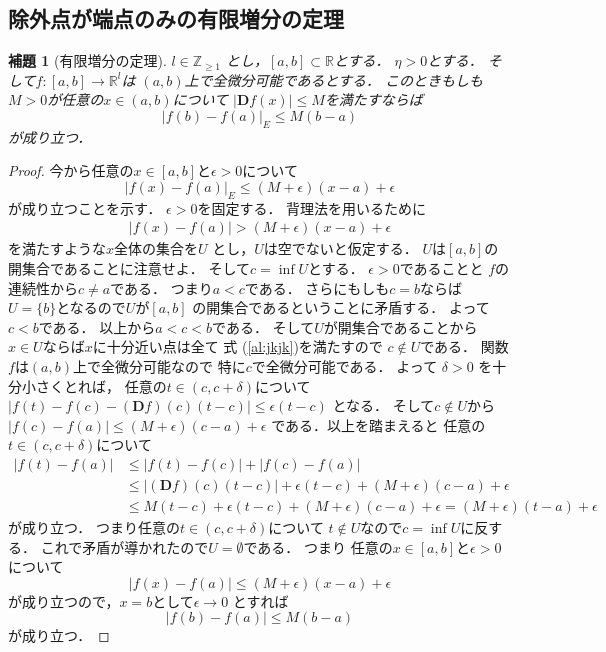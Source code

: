 \documentclass[leqno, a4paper, 12pt]{jsarticle}
\newtheorem{lem}[thm]{補題}
\newcommand{\zz}{\mathbb{Z}}
\newcommand{\rr}{\mathbb{R}}
\newcommand{\ddd}{\mathbf{D}}
\begin{document}
\subsection{除外点が端点のみの有限増分の定理}
\begin{lem}[有限増分の定理]\label{lem:increment}
$l\in \zz_{\ge 1}$
とし，$[a, b]\subset \rr$とする．
$\eta>0$とする．
そして$f: [a, b]\to \rr^{l}$は
$(a, b)$上で全微分可能であるとする．
このときもしも$M>0$が任意の$x\in (a, b)$について
$|\ddd f(x)|\le M$を満たすならば
\[
|f(b)-f(a)|_{E}\le M(b-a)
\]
が成り立つ．
\end{lem}
\begin{proof}
今から任意の$x\in [a, b]$と$\epsilon>0$について
\[
|f(x)-f(a)|_{E}\le (M+\epsilon)(x-a)+\epsilon
\]
が成り立つことを示す．
$\epsilon>0$を固定する．
背理法を用いるために
\begin{align}\label{al:jkjk}
|f(x)-f(a)|> (M+\epsilon)(x-a)+\epsilon
\end{align}
を満たすような$x$全体の集合を$U$
とし，$U$は空でないと仮定する．
$U$は$[a, b]$の開集合であることに注意せよ．
そして$c=\inf U$とする．
$\epsilon>0$であることと
$f$の連続性から$c\neq a$である．
つまり$a<c$である．
さらにもしも$c=b$ならば
$U=\{b\}$となるので$U$が$[a, b]$
の開集合であるということに矛盾する．
よって$c<b$である．
以上から$a<c<b$である．
そして$U$が開集合であることから
$x\in U$ならば$x$に十分近い点は全て
式 (\ref{al:jkjk})を満たすので
$c\not \in U$である．
関数$f$は$(a, b)$上で全微分可能なので
特に$c$で全微分可能である．
よって
$\delta>0$
を十分小さくとれば，
任意の$t\in (c, c+\delta)$について
$|f(t)-f(c)-(\ddd f)(c)(t-c)|\le \epsilon (t-c)$
となる．
そして$c\not\in U$から
$|f(c)-f(a)|\le (M+\epsilon)(c-a)+\epsilon$
である．以上を踏まえると
任意の$t\in (c, c+\delta)$について
\begin{align*}
|f(t)-f(a)|&\le 
|f(t)-f(c)|+|f(c)-f(a)|
\\
&\le |(\ddd f)(c)(t-c)|+\epsilon(t-c)+
 (M+\epsilon)(c-a)+\epsilon
\\
& \le M(t-c)+\epsilon(t-c)+
 (M+\epsilon)(c-a)+\epsilon
 =(M+\epsilon)(t-a)+\epsilon
\end{align*}
が成り立つ．
つまり任意の$t\in (c, c+\delta)$について
$t\not \in U$なので$c=\inf U$に反する．
これで矛盾が導かれたので$U=\emptyset$である．
つまり
任意の$x\in [a, b]$と$\epsilon>0$について
\[
|f(x)-f(a)|\le (M+\epsilon)(x-a)+\epsilon
\]
が成り立つので，$x=b$として$\epsilon\to 0$
とすれば
\[
|f(b)-f(a)|\le M(b-a)
\]
が成り立つ．
\end{proof}
\end{document}
